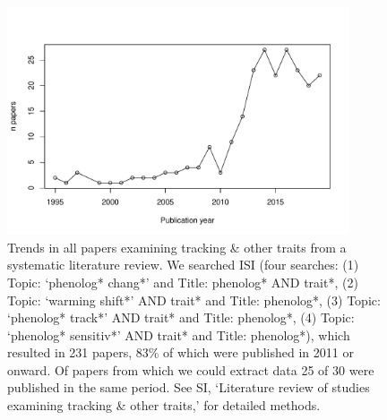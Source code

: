 \documentclass[11pt,letterpaper]{article}
\begin{document}
\begin{figure}[h!]
\centering
\includegraphics[width=0.9\textwidth]{..//..//..//R/graphs/otherdat/papersovertime.pdf}
\caption{Trends in all papers examining tracking \& other traits from a systematic literature review. We searched ISI (four searches: (1) Topic: `phenolog* chang*' and Title: phenolog* AND trait*, (2) Topic: `warming shift*' AND trait* and Title: phenolog*, (3) Topic: `phenolog* track*' AND trait* and Title: phenolog*, (4) Topic: `phenolog* sensitiv*' AND trait* and Title: phenolog*), which resulted in 231 papers, 83\% of which were published in 2011 or onward. Of papers from which we could extract data 25 of 30 were published in the same period. See SI, `Literature review of studies examining tracking \& other traits,' for detailed methods. }
  \label{fig:papertrends}
\end{figure}
\end{document}
